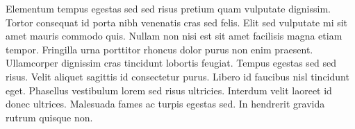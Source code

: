 \documentclass[10pt]{article} %
\begin{document}
\begin{multicols}{2}
Elementum tempus egestas sed sed risus pretium quam vulputate dignissim. Tortor consequat id porta nibh venenatis cras sed felis. Elit sed vulputate mi sit amet mauris commodo quis. Nullam non nisi est sit amet facilisis magna etiam tempor. Fringilla urna porttitor rhoncus dolor purus non enim praesent. Ullamcorper dignissim cras tincidunt lobortis feugiat. Tempus egestas sed sed risus. Velit aliquet sagittis id consectetur purus. Libero id faucibus nisl tincidunt eget. Phasellus vestibulum lorem sed risus ultricies. Interdum velit laoreet id donec ultrices. Malesuada fames ac turpis egestas sed. In hendrerit gravida rutrum quisque non.



\end{multicols}
\end{document}

